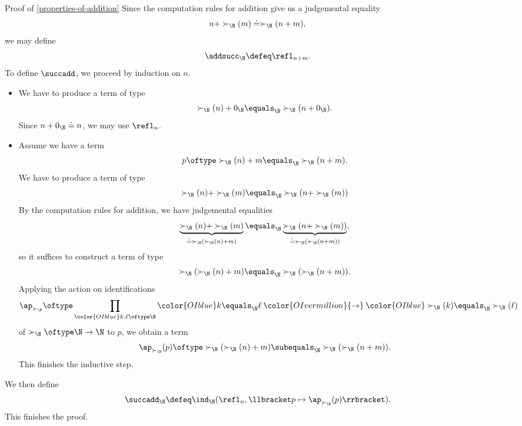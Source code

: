 \begin{Proof}{Proof of \cref{properties-of-addition}}
    Since the computation rules for addition give us a judgemental equality
    \[
        n+\succ_{\N}(m)%
        \doteq%
        \succ_{\N}(n+m),%
    \]%
    we may define
    \[
        \addsucc_{\N}%
        \defeq%
        \refl_{n+m}.%
    \]%
    To define $\succadd$, we proceed by induction on $n$.
    \begin{itemize}
        \item{}We have to produce a term of type
            \[
                \succ_{\N}(n)+0_{\N}%
                \equals_{\N}%
                \succ_{\N}(n+0_{\N}).%
            \]%
            Since $n+0_{\N}\doteq n$, we may use $\refl_{n}$.
        \item{}Assume we have a term
            \[
                p%
                \oftype%
                \succ_{\N}(n)+m%
                \equals_{\N}%
                \succ_{\N}(n+m).%
            \]%
            We have to produce a term of type
            \[
                \succ_{\N}(n)+\succ_{\N}(m)%
                \equals_{\N}%
                \succ_{\N}(n+\succ_{\N}(m))%
            \]%
            By the computation rules for addition, we have judgemental equalities
            \[
                \underbrace{\succ_{\N}(n)+\succ_{\N}(m)}_{{}\doteq\succ_{\N}(\succ_{\N}(n)+m)}%
                \equals_{\N}%
                \underbrace{\succ_{\N}(n+\succ_{\N}(m))}_{{}\doteq\succ_{\N}(\succ_{\N}(n+m))},%
            \]%
            so it suffices to construct a term of type
            \[
                \succ_{\N}(\succ_{\N}(n)+m)%
                \equals_{\N}%
                \succ_{\N}(\succ_{\N}(n+m)).%
            \]%
            Applying the action on identifications
            \[
                \ap_{\succ_{\N}}%
                \oftype%
                \prod_{{\color{OIblue}k,\ell\oftype\N}}{\color{OIblue}k\equals_{\N}\ell}\mathbin{\color{OIvermillion}{\to}}{\color{OIblue}\succ_{\N}(k)\equals_{\N}\succ_{\N}(\ell)}%
            \]%
            of $\succ_{\N}\oftype\N\to\N$ to $p$, we obtain a term
            \[
                \ap_{\succ_{\N}}(p)%
                \oftype%
                \succ_{\N}(\succ_{\N}(n)+m)%
                \subequals_{\N}%
                \succ_{\N}(\succ_{\N}(n+m)).%
            \]%
            This finishes the inductive step.
    \end{itemize}
    We then define
    \[
        \succadd_{\N}%
        \defeq%
        \ind_{\N}(\refl_{n},\llbracket p\mapsto\ap_{\succ_{\N}}(p)\rrbracket).%
    \]%
    This finishes the proof.


\end{Proof}

